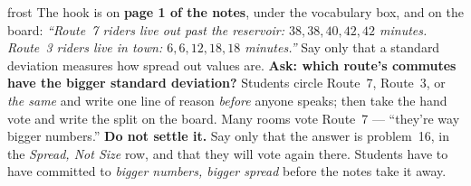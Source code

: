 \documentclass[10pt]{article}
\begin{document}
\boxguard
\begin{skillbox}{frost}
The hook is on \textbf{page 1 of the notes}, under the vocabulary box, and on the board:
\textit{``Route~7 riders live out past the reservoir: $38, 38, 40, 42, 42$ minutes. Route~3 riders
live in town: $6, 6, 12, 18, 18$ minutes.''} Say only that a standard deviation measures how
spread out values are. \textbf{Ask: which route's commutes have the bigger standard deviation?}
Students circle Route~7, Route~3, or \emph{the same} and write one line of reason \emph{before}
anyone speaks; then take the hand vote and write the split on the board. Many rooms vote Route~7
--- ``they're way bigger numbers.'' \textbf{Do not settle it.} Say only that the answer is
problem~16, in the \emph{Spread, Not Size} row, and that they will vote again there. Students
have to have committed to \emph{bigger numbers, bigger spread} before the notes take it away.
\end{skillbox}
\end{document}
